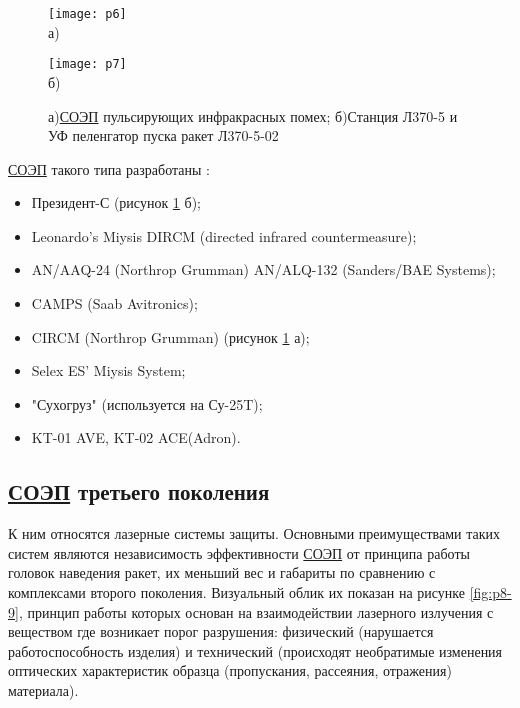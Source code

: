 
\begin{figure}[ht]
	\begin{minipage}[b][][b]{0.49\linewidth}\centering
		\texttt{[image: p6]} \\ а)
	\end{minipage}
	\hfill
	\begin{minipage}[b][][b]{0.49\linewidth}\centering
		\texttt{[image: p7]} \\ б)
	\end{minipage}
	
	\caption{а)\hyperref[acroSOEP]{СОЭП} пульсирующих инфракрасных помех; б)Станция Л370-5 и УФ пеленгатор пуска ракет Л370-5-02}
	\label{fig:p6-7}
\end{figure}

\hyperref[acroSOEP]{СОЭП} такого типа разработаны \cite[]{Infrared_countermeasure}:
\begin{itemize}
	\item Президент-С (рисунок \ref{fig:p6-7} б);
	\item Leonardo’s Miysis DIRCM (directed infrared countermeasure);
	\item AN/AAQ-24 (Northrop Grumman) AN/ALQ-132 (Sanders/BAE Systems);
	\item CAMPS (Saab Avitronics);
	\item CIRCM (Northrop Grumman) (рисунок \ref{fig:p6-7} а);
	\item Selex ES' Miysis System;
	\item "Сухогруз" (используется на Су-25T);
	\item KT-01 AVE, KT-02 ACE(Adron).		
\end{itemize}



\subsection{ \hyperref[acroSOEP]{СОЭП} третьего поколения}	
К  ним относятся лазерные системы защиты. Основными преимуществами таких систем являются независимость эффективности \hyperref[acroSOEP]{СОЭП} от принципа работы головок наведения ракет, их меньший вес и габариты по сравнению с комплексами второго поколения. Визуальный облик их показан на рисунке \ref{fig:p8-9}, принцип работы которых основан на взаимодействии лазерного излучения с веществом где возникает порог разрушения: физический (нарушается работоспособность изделия) и технический (происходят необратимые изменения оптических характеристик образца (пропускания, рассеяния, отражения) материала)\cite[]{manta}. 

